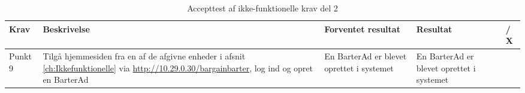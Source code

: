 \setlength{\arrayrulewidth}{0.3mm}
\setlength{\tabcolsep}{2pt}
\renewcommand{\arraystretch}{1.5}
\begin{table}[H]
	\begin{tabular}{ |p{1.4cm}|p{5.0cm}|p{5.0cm}|p{3.8cm}|p{1.0cm}| } 
		\hline
		\textbf{Krav} & \textbf{Beskrivelse} & \textbf{Forventet resultat} & \textbf{Resultat} & \textbf{\checkmark / X} \\
		\hline
		Punkt 9 & Tilgå hjemmesiden fra en af de afgivne enheder i afsnit \ref{ch:Ikkefunktionelle} via \url{http://10.29.0.30/bargainbarter}, log ind og opret en BarterAd  & En BarterAd er blevet oprettet i systemet & En BarterAd er blevet oprettet i systemet & \checkmark \\
		\hline
	\end{tabular}
	\caption{Accepttest af ikke-funktionelle krav del 2}
	\label{table:accepttest_udfort2}
\end{table}